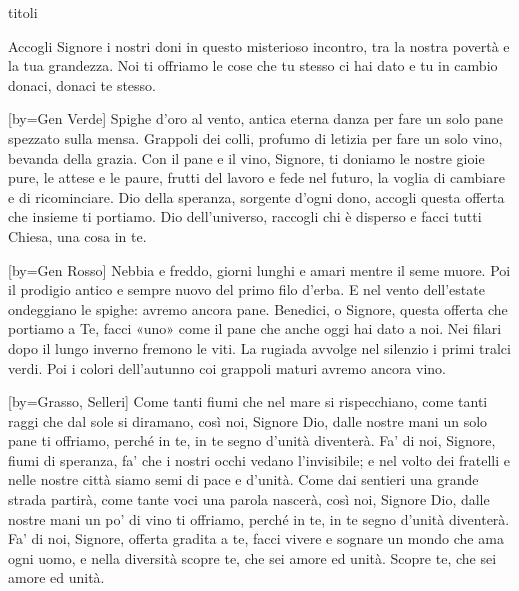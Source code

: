 \begin{songs}{titoli}

\beginverse
Accogli Signore i nostri doni
in questo misterioso incontro,
tra la nostra povertà e la tua grandezza.
\endverse
\beginverse
Noi ti offriamo le cose che tu stesso ci hai dato
e tu in cambio donaci, donaci te stesso.
\endverse
\endsong

[by={Gen Verde}]
\beginverse
Spighe d'oro al vento, antica eterna danza
per fare un solo pane spezzato sulla mensa.
Grappoli dei colli, profumo di letizia
per fare un solo vino, bevanda della grazia.
\endverse
\beginverse
Con il pane e il vino, Signore, ti doniamo
le nostre gioie pure, le attese e le paure,
frutti del lavoro e fede nel futuro,
la voglia di cambiare e di ricominciare.
\endverse
\beginverse
Dio della speranza, sorgente d'ogni dono,
accogli questa offerta che insieme ti portiamo.
Dio dell'universo, raccogli chi è disperso
e facci tutti Chiesa, una cosa in te.
\endverse
\endsong

[by={Gen Rosso}]
\beginverse
Nebbia e freddo, giorni lunghi e amari mentre il seme muore.
Poi il prodigio antico e sempre nuovo del primo filo d'erba.
E nel vento dell'estate ondeggiano le spighe:
avremo ancora pane.
\endverse
\beginchorus
Benedici, o Signore,
questa offerta che portiamo a Te,
facci «uno» come il pane
che anche oggi hai dato a noi.
\endchorus
\beginverse
Nei filari dopo il lungo inverno fremono le viti.
La rugiada avvolge nel silenzio i primi tralci verdi.
Poi i colori dell'autunno coi grappoli maturi
avremo ancora vino.
\endverse
\endsong

[by={Grasso, Selleri}]
\beginverse
Come tanti fiumi che nel mare si rispecchiano,
come tanti raggi che dal sole si diramano,
così noi, Signore Dio, dalle nostre mani
un solo pane ti offriamo, perché in te, in te
segno d'unità diventerà.
\endverse
\beginchorus
Fa' di noi, Signore, fiumi di speranza,
fa' che i nostri occhi vedano l'invisibile;
e nel volto dei fratelli e nelle nostre città
siamo semi di pace e d'unità.
\endchorus
\beginverse
Come dai sentieri una grande strada partirà,
come tante voci una parola nascerà,
così noi, Signore Dio, dalle nostre mani
un po' di vino ti offriamo, perché in te, in te
segno d'unità diventerà.
\endverse
\beginverse
Fa' di noi, Signore, offerta gradita a te,
facci vivere e sognare un mondo che
ama ogni uomo, e nella diversità
scopre te, che sei amore ed unità.
Scopre te, che sei amore ed unità.
\endverse
\endsong


\end{songs}
